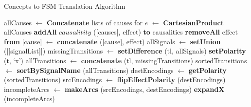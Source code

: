 \begin{table}[ht]
\begin{minipage}[]{.58\textwidth}
\begin{algorithm}[H]
\raggedright
\begin{algorithmic}[5]	%
	\caption{Concepts to FSM Translation Algorithm\label{alg:fsm}}
                    \State allCauses $\leftarrow$ \textbf{Concatenate} lists of causes for $e$ \label{alg:list}
                    \State [causes] $\leftarrow$ \textbf{CartesianProduct} allCauses
                    \State \textbf{addAll} $causalitity$ ([causes], effect) \textbf{to} causalities
          \EndFor
		\State \textbf{removeAll} effect \textbf{from} [cause]
		\State [signalList] $\leftarrow$ \textbf{concatenate} ([cause], effect)
	\EndFor
	\State allSignals $\leftarrow$ \textbf{setUnion} ([[signalList]])
		\State missingTransitions $\leftarrow$ \textbf{setDifference} (tl, allSignals)
			\State \textbf{setPolarity} (t, `x')
		\EndFor
		\State allTransitions $\leftarrow$ \textbf{concatenate} (tl, missingTransitions)
		\State sortedTransitions $\leftarrow$
		\Statex[2] \textbf{sortBySignalName} (allTransitions)
		\State destEncodings $\leftarrow$ \textbf{getPolarity} (sortedTransitions)
		\State srcEncodings $\leftarrow$ \textbf{flipEffectPolarity} (destEncodings)
		\State incompleteArcs $\leftarrow$
		\Statex[2] \textbf{makeArcs} (srcEncodings, destEncodings)
		\State \textbf{expandX} (incompleteArcs)
	\EndFor
\end{algorithmic}
\end{algorithm}
\end{minipage}
\hfill
\end{table}
